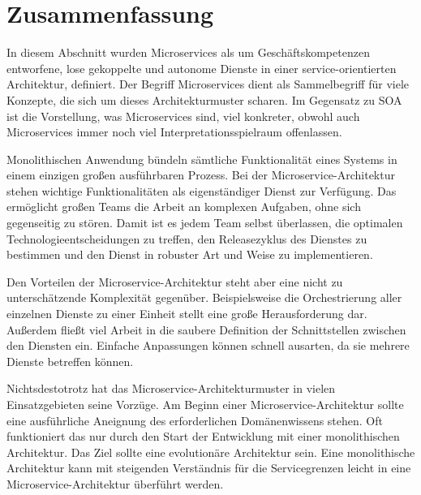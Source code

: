 \section{Zusammenfassung}

In diesem Abschnitt wurden Microservices als um Geschäftskompetenzen entworfene, lose gekoppelte und autonome Dienste in einer service-orientierten Architektur, definiert. Der Begriff Microservices dient als Sammelbegriff für viele Konzepte, die sich um dieses Architekturmuster scharen. Im Gegensatz zu SOA ist die Vorstellung, was Microservices sind, viel konkreter, obwohl auch Microservices immer noch viel Interpretationsspielraum offenlassen.

Monolithischen Anwendung bündeln sämtliche Funktionalität eines Systems in einem einzigen großen ausführbaren Prozess. Bei der Microservice-Architektur stehen wichtige Funktionalitäten als eigenständiger Dienst zur Verfügung. Das ermöglicht großen Teams die Arbeit an komplexen Aufgaben, ohne sich gegenseitig zu stören. Damit ist es jedem Team selbst überlassen, die optimalen Technologieentscheidungen zu treffen, den Releasezyklus des Dienstes zu bestimmen und den Dienst in robuster Art und Weise zu implementieren.

Den Vorteilen der Microservice-Architektur steht aber eine nicht zu unterschätzende Komplexität gegenüber. Beispielsweise die Orchestrierung aller einzelnen Dienste zu einer Einheit stellt eine große Herausforderung dar. Außerdem fließt viel Arbeit in die saubere Definition der Schnittstellen zwischen den Diensten ein. Einfache Anpassungen können schnell ausarten, da sie mehrere Dienste betreffen können. 

Nichtsdestotrotz hat das Microservice-Architekturmuster in vielen Einsatzgebieten seine Vorzüge. Am Beginn einer Microservice-Architektur sollte eine ausführliche Aneignung des erforderlichen Domänenwissens stehen. Oft funktioniert das nur durch den Start der Entwicklung mit einer monolithischen Architektur. Das Ziel sollte eine evolutionäre Architektur sein. Eine monolithische Architektur kann mit steigenden Verständnis für die Servicegrenzen leicht in eine Microservice-Architektur überführt werden.